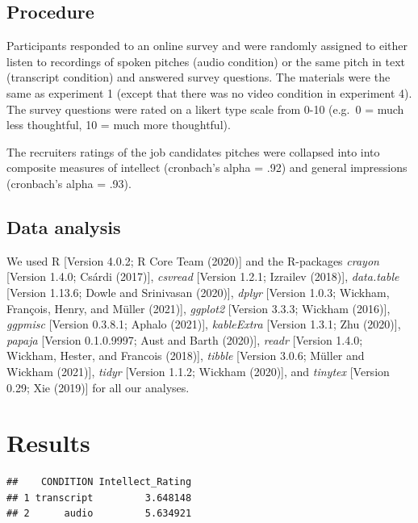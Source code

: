 \documentclass[
  english,
  man]{apa6}
\begin{document}
\hypertarget{procedure}{%
\subsection{Procedure}\label{procedure}}

Participants responded to an online survey and were randomly assigned to either listen to recordings of spoken pitches (audio condition) or the same pitch in text (transcript condition) and answered survey questions. The materials were the same as experiment 1 (except that there was no video condition in experiment 4). The survey questions were rated on a likert type scale from 0-10 (e.g.~0 = much less thoughtful, 10 = much more thoughtful).

The recruiters ratings of the job candidates pitches were collapsed into into composite measures of intellect (cronbach's alpha = .92) and general impressions (cronbach's alpha = .93).

\hypertarget{data-analysis}{%
\subsection{Data analysis}\label{data-analysis}}

We used R {[}Version 4.0.2; R Core Team (2020){]} and the R-packages \emph{crayon} {[}Version 1.4.0; Csárdi (2017){]}, \emph{csvread} {[}Version 1.2.1; Izrailev (2018){]}, \emph{data.table} {[}Version 1.13.6; Dowle and Srinivasan (2020){]}, \emph{dplyr} {[}Version 1.0.3; Wickham, François, Henry, and Müller (2021){]}, \emph{ggplot2} {[}Version 3.3.3; Wickham (2016){]}, \emph{ggpmisc} {[}Version 0.3.8.1; Aphalo (2021){]}, \emph{kableExtra} {[}Version 1.3.1; Zhu (2020){]}, \emph{papaja} {[}Version 0.1.0.9997; Aust and Barth (2020){]}, \emph{readr} {[}Version 1.4.0; Wickham, Hester, and Francois (2018){]}, \emph{tibble} {[}Version 3.0.6; Müller and Wickham (2021){]}, \emph{tidyr} {[}Version 1.1.2; Wickham (2020){]}, and \emph{tinytex} {[}Version 0.29; Xie (2019){]} for all our analyses.

\hypertarget{results}{%
\section{Results}\label{results}}

\begin{verbatim}
##    CONDITION Intellect_Rating
## 1 transcript         3.648148
## 2      audio         5.634921
\end{verbatim}
\end{document}
